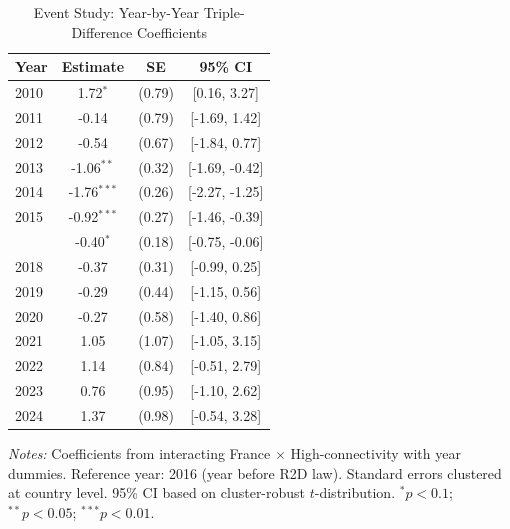 \begin{table}[htbp]
\centering
\caption{Event Study: Year-by-Year Triple-Difference Coefficients}
\label{tab:event}
\begin{tabular}{lccc}
\toprule
Year & Estimate & SE & 95\% CI \\
\midrule
2010 & 1.72$^{*}$ & (0.79) & [0.16, 3.27] \\
2011 & -0.14 & (0.79) & [-1.69, 1.42] \\
2012 & -0.54 & (0.67) & [-1.84, 0.77] \\
2013 & -1.06$^{**}$ & (0.32) & [-1.69, -0.42] \\
2014 & -1.76$^{***}$ & (0.26) & [-2.27, -1.25] \\
2015 & -0.92$^{***}$ & (0.27) & [-1.46, -0.39] \\
\addlinespace
2017 & -0.40$^{*}$ & (0.18) & [-0.75, -0.06] \\
2018 & -0.37 & (0.31) & [-0.99, 0.25] \\
2019 & -0.29 & (0.44) & [-1.15, 0.56] \\
2020 & -0.27 & (0.58) & [-1.40, 0.86] \\
2021 & 1.05 & (1.07) & [-1.05, 3.15] \\
2022 & 1.14 & (0.84) & [-0.51, 2.79] \\
2023 & 0.76 & (0.95) & [-1.10, 2.62] \\
2024 & 1.37 & (0.98) & [-0.54, 3.28] \\
\bottomrule
\end{tabular}
\begin{tablenotes}
\small
\item \textit{Notes:} Coefficients from interacting France $\times$ High-connectivity with year dummies.
Reference year: 2016 (year before R2D law). Standard errors clustered at country level.
95\% CI based on cluster-robust $t$-distribution.
$^{*}p<0.1$; $^{**}p<0.05$; $^{***}p<0.01$.
\end{tablenotes}
\end{table}
